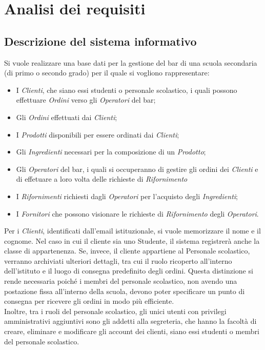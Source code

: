 \documentclass[12pt,a4paper]{article}
\begin{document}
    \section{Analisi dei requisiti}
    \subsection{Descrizione del sistema informativo}
    \label{par:Descrizione del sistema informativo}
    Si vuole realizzare una base dati per la gestione del bar di una scuola secondaria (di primo o secondo grado) per il quale si vogliono rappresentare:
    \begin{itemize}[leftmargin=1em]
        \item I \textit{Clienti}, che siano essi studenti o personale scolastico, i quali possono effettuare \textit{Ordini} verso gli \textit{Operatori} del bar;
        \item Gli \textit{Ordini} effettuati dai \textit{Clienti};
        \item I \textit{Prodotti} disponibili per essere ordinati dai \textit{Clienti};
        \item Gli \textit{Ingredienti} necessari per la composizione di un \textit{Prodotto};
        \item Gli \textit{Operatori} del bar, i quali si occuperanno di gestire gli ordini dei \textit{Clienti} e di effetuare a loro volta delle richieste di \textit{Rifornimento}
        \item I \textit{Rifornimenti} richiesti dagli \textit{Operatori} per l'acquisto degli \textit{Ingredienti};
        \item I \textit{Fornitori} che possono visionare le richieste di \textit{Rifornimento} degli \textit{Operatori}.
    \end{itemize}

    \vspace{8pt}
    \noindent
    Per i \textit{Clienti}, identificati dall'email istituzionale, si vuole memorizzare il nome e il cognome. Nel caso in cui il cliente sia uno Studente, il sistema registrerà anche la classe di appartenenza. Se, invece, il cliente appartiene al Personale scolastico, verranno archiviati ulteriori dettagli, tra cui il ruolo ricoperto all'interno dell'istituto e il luogo di consegna predefinito degli ordini. Questa distinzione si rende necessaria poiché i membri del personale scolastico, non avendo una postazione fissa all'interno della scuola, devono poter specificare un punto di consegna per ricevere gli ordini in modo più efficiente.\\
    Inoltre, tra i ruoli del personale scolastico, gli unici utenti con privilegi amministrativi aggiuntivi sono gli addetti alla segreteria, che hanno la facoltà di creare, eliminare e modificare gli account dei clienti, siano essi studenti o membri del personale scolastico.
\end{document}
